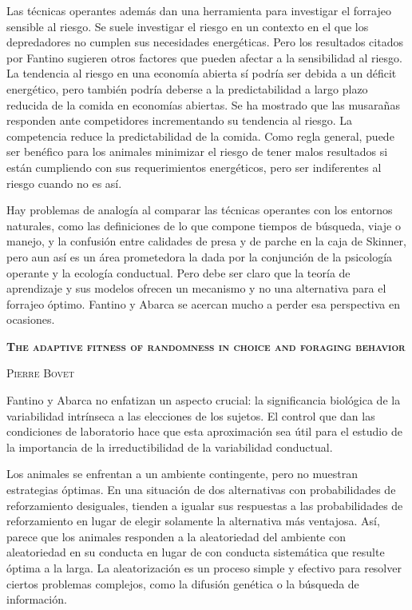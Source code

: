 \documentclass[a4paper,12pt]{article}
\begin{document}
Las técnicas operantes además dan una herramienta para investigar el forrajeo sensible al riesgo. Se suele investigar el riesgo en un contexto en el que los depredadores no cumplen sus necesidades energéticas. Pero los resultados citados por Fantino sugieren otros factores que pueden afectar a la sensibilidad al riesgo. La tendencia al riesgo en una economía abierta sí podría ser debida a un déficit energético, pero también podría deberse a la predictabilidad a largo plazo reducida de la comida en economías abiertas. Se ha mostrado que las musarañas responden ante competidores incrementando su tendencia al riesgo. La competencia reduce la predictabilidad de la comida. Como regla general, puede ser benéfico para los animales minimizar el riesgo de tener malos resultados si están cumpliendo con sus requerimientos energéticos, pero ser indiferentes al riesgo cuando no es así.

Hay  problemas de analogía al comparar las técnicas operantes con los entornos naturales, como las definiciones de lo que compone tiempos de búsqueda, viaje o manejo, y la confusión entre calidades de presa y de parche en la caja de Skinner, pero aun así es un área prometedora la dada por la conjunción de la psicología operante y la ecología conductual. Pero debe ser claro que la teoría de aprendizaje y sus modelos ofrecen un mecanismo y no una alternativa para el forrajeo óptimo. Fantino y Abarca se acercan mucho a perder esa perspectiva en ocasiones.

{\scshape\bfseries The adaptive fitness of randomness in choice and foraging behavior}

{\scshape Pierre Bovet}

Fantino y Abarca no enfatizan un aspecto crucial: la significancia biológica de la variabilidad intrínseca a las elecciones de los sujetos. El control que dan las condiciones de laboratorio hace que esta aproximación sea útil para el estudio de la importancia de la irreductibilidad de la variabilidad conductual.

Los animales se enfrentan a un ambiente contingente, pero no muestran estrategias óptimas. En una situación de dos alternativas con probabilidades de reforzamiento desiguales, tienden a igualar sus respuestas a las probabilidades de reforzamiento en lugar de elegir solamente la alternativa más ventajosa. Así, parece que los animales responden a la aleatoriedad del ambiente con aleatoriedad en su conducta en lugar de con conducta sistemática que resulte óptima a la larga. La aleatorización es un proceso simple y efectivo para resolver ciertos problemas complejos, como la difusión genética o la búsqueda de información.
\end{document}
